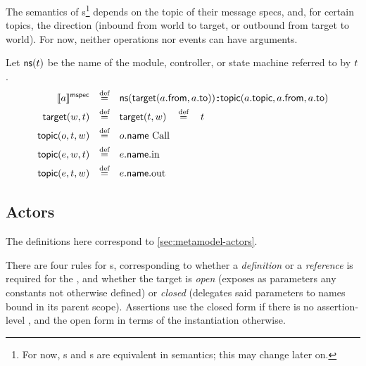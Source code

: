 \begin{defn}[\mmessagespec]

The semantics of \mmessagespec s\footnote{For now, \mgapmessagespec s and
\marrowmessagespec s are equivalent in semantics; this may change later on.}
depends on the topic of their message specs,
and, for certain topics, the direction (inbound from world to target, or
outbound from target to world).  For now, neither operations nor events can have
arguments.

\newcommand{\nsOf}[1]{\mathsf{ns}(#1)}
\newcommand{\targetOf}[2]{\mathsf{target}(#1,#2)}
\newcommand{\topicOf}[3]{\mathsf{topic}(#1,#2,#3)}

Let \(\nsOf{\atarget}\) be the name of the module, controller, or state machine
referred to by \(t\).
%
\begin{align*}
	\mspecsema{\anarrow}
\quad\defeq\quad&
	\nsOf{\targetOf{\field{\anarrow}{from}}{\field{\anarrow}{to}}}
	\cspnsop
	\topicOf{\field{\anarrow}{topic}}{\field{\anarrow}{from}}{\field{\anarrow}{to}}
\\
	\targetOf{\aworld}{\atarget}
\quad\defeq\quad&
	\targetOf{\atarget}{\aworld}
	\quad\defeq\quad
	\atarget
\\
	\topicOf{\anop}{\atarget}{\aworld}
\quad\defeq\quad&
	\field{\anop}{name}\ \text{Call}
\\
	\topicOf{\anevent}{\aworld}{\atarget}
\quad\defeq\quad&
	\field{\anevent}{name}.\text{in}
\\
	\topicOf{\anevent}{\atarget}{\aworld}
\quad\defeq\quad&
	\field{\anevent}{name}.\text{out}
\end{align*}

\end{defn}

\subsection{Actors}\label{ssec:semantics-tockcsp-actors}

The definitions here correspond to \cref{sec:metamodel-actors}.


There are four rules for \mtarget{}s, corresponding to whether a
\emph{definition} or a \emph{reference} is required for the
\mtarget, and whether the target is \emph{open}
(exposes as parameters any constants not otherwise defined) or
\emph{closed} (delegates said parameters to names bound
in its parent scope).  Assertions use the closed form if there is no
assertion-level \mtargetinstantiation, and the open form in terms of the
instantiation otherwise.

